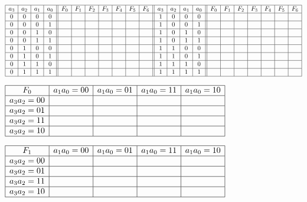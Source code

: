 \begin{center}
$\begin{array}{|c|c|c|c||c|c|c|c|c|c|c||c|c|c|c||c|c|c|c|c|c|c|}
\hline
a_3 & a_2 & a_1 & a_0 & F_0 & F_1 & F_2 & F_3 & F_4 & F_5 & F_6 & a_3 & a_2 & a_1 & a_0 & F_0 & F_1 & F_2 & F_3 & F_4 & F_5 & F_6  \\
\hline
0 & 0 & 0 & 0 &  &  &  &  &  &  &  & 1 & 0 & 0 & 0 &  &  &  &  &  &  &  \\
\hline
0 & 0 & 0 & 1 &  &  &  &  &  &  &  & 1 & 0 & 0 & 1 &  &  &  &  &  &  &  \\
\hline
0 & 0 & 1 & 0 &  &  &  &  &  &  &  & 1 & 0 & 1 & 0 &  &  &  &  &  &  &  \\
\hline
0 & 0 & 1 & 1 &  &  &  &  &  &  &  & 1 & 0 & 1 & 1 &  &  &  &  &  &  &  \\
\hline
0 & 1 & 0 & 0 &  &  &  &  &  &  &  & 1 & 1 & 0 & 0 &  &  &  &  &  &  &  \\
\hline
0 & 1 & 0 & 1 &  &  &  &  &  &  &  & 1 & 1 & 0 & 1 &  &  &  &  &  &  &  \\
\hline
0 & 1 & 1 & 0 &  &  &  &  &  &  &  & 1 & 1 & 1 & 0 &  &  &  &  &  &  &  \\
\hline
0 & 1 & 1 & 1 &  &  &  &  &  &  &  & 1 & 1 & 1 & 1 &  &  &  &  &  &  &  \\
\hline
\end{array}$
\end{center}


\begin{center}
$\begin{array}{|c|c|c|c|c|}
\hline
F_0 & a_1a_0=00 & a_1a_0=01 & a_1a_0=11 & a_1a_0=10 \\
\hline
a_3a_2=00  &    &    &    &    \\
\hline
a_3a_2=01  &    &    &    &    \\
\hline
a_3a_2=11  &    &    &    &    \\
\hline
a_3a_2=10  &    &    &    &    \\
\hline
\end{array}$
\end{center}

\begin{center}
$\begin{array}{|c|c|c|c|c|}
\hline
F_1 & a_1a_0=00 & a_1a_0=01 & a_1a_0=11 & a_1a_0=10 \\
\hline
a_3a_2=00  &    &    &    &    \\
\hline
a_3a_2=01  &    &    &    &    \\
\hline
a_3a_2=11  &    &    &    &    \\
\hline
a_3a_2=10  &    &    &    &    \\
\hline
\end{array}$
\end{center}

